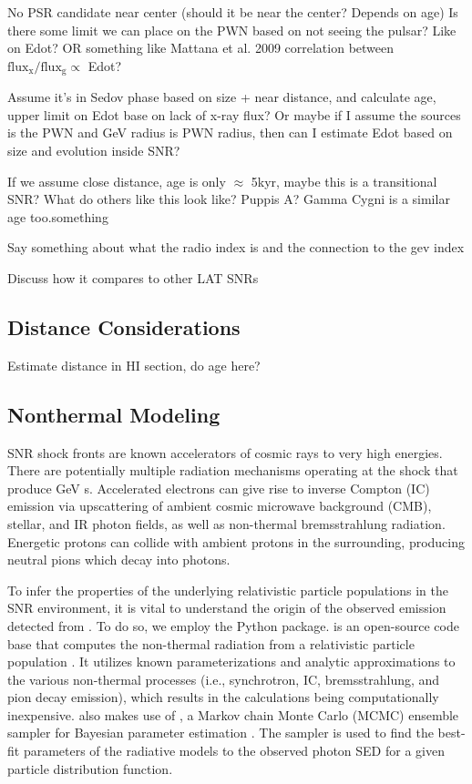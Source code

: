 No PSR candidate near center (should it be near the center? Depends on age)
Is there some limit we can place on the PWN based on not seeing the pulsar? Like on Edot? OR something like Mattana et al. 2009 correlation between  $\mathrm{flux_x / flux_g \propto}$   Edot? 

Assume it's in Sedov phase based on size + near distance, and calculate age, upper limit on Edot base on lack of x-ray flux? Or maybe if I assume the sources is the PWN and GeV radius is PWN radius, then can I estimate Edot based on size and evolution inside  SNR?

If we assume close distance, age is only $\approx$ 5kyr, maybe this is a transitional SNR? What do others like this look like? Puppis A? Gamma Cygni is a similar age too.something 

Say something about what the radio index is and the connection to the gev index

Discuss how it compares to other LAT SNRs
\subsection{Distance Considerations}\label{sec:Dist}
Estimate distance in HI section, do age here?
\subsection{Nonthermal Modeling}\label{sec:naima}

SNR shock fronts are known accelerators of cosmic rays to very high energies. There are potentially multiple radiation mechanisms operating at the shock that produce GeV \gam{}s. Accelerated electrons can give rise to inverse Compton (IC) emission via upscattering of ambient cosmic microwave background (CMB), stellar, and IR photon fields, as well as non-thermal bremsstrahlung radiation. Energetic protons can collide with ambient protons in the surrounding, producing neutral pions which decay into \gam{} photons. 

To infer the properties of the underlying relativistic particle populations in the SNR environment, it is vital to understand the origin of the observed \gam{} emission detected from  \Gone{}. To do so, we employ the \nai{} Python package. \nai{} is an open-source code base that computes the non-thermal radiation from a relativistic particle population \citep{Zabalza15}. It utilizes known parameterizations and analytic approximations to the various non-thermal processes (i.e., synchrotron, IC, bremsstrahlung, and pion decay emission), which results in the calculations being computationally inexpensive. \nai{} also makes use of \emc{}, a Markov chain Monte Carlo (MCMC) ensemble sampler for Bayesian parameter estimation \citep{Foreman13}. The sampler is used to find the best-fit parameters of the radiative models to the observed photon SED for a given particle distribution function. 

